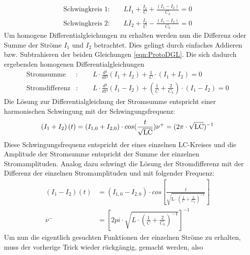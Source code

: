 \documentclass[titlepage = firstcover]{scrartcl}
\begin{document}
        \begin{align}
            \text{Schwingkreis 1:} \qquad L\ddot{I_1} + \frac{I_1}{C} + \frac{\left(I_1 - I_2\right)}{C_k} = 0 \\
            \text{Schwingkreis 2:} \qquad L\ddot{I_2} + \frac{I_2}{C} - \frac{\left(I_1 - I_2\right)}{C_k} = 0 
            \label{eqn:ProtoDGL}
        \end{align}
        Um homogene Differentialgleichungen zu erhalten werden nun die Differenz oder Summe der Ströme $I_1$ und $I_2$ betrachtet. Dies gelingt durch 
        einfaches Addieren bzw. Subtrahieren der beiden Gleichungen \ref{eqn:ProtoDGL}. 
        Die sich dadurch ergebenden homogenen Differentialgleichungen
        \begin{align}
            \text{Stromsumme} &: \qquad L \cdot \frac{d²}{dt²}\left(I_1+I_2\right) + \frac{1}{C} \cdot \left(I_1 + I_2\right) = 0 \\
            \text{Stromdifferenz} &: \qquad L \cdot \frac{d²}{dt²}\left(I_1-I_2\right) + \left(\frac{1}{C}+\frac{2}{C_k}\right) \cdot \left(I_1 - I_2\right) = 0
        \end{align}
        Die Lösung zur Differentialgleichung der Stromsumme entspricht einer harmonischen Schwingung mit der Schwingungsfrequenz:
        \begin{equation}
            \left(I_1 + I_2\right)(t) = \left(I_{1,0} + I_{2,0}\right) \cdot cos(\frac{t}{\sqrt{\text{LC}}}) \\
            \nu^+ = (2\pi \cdot \sqrt{\text{LC}})^{-1} 
            \label{eqn:nu+}
        \end{equation}
        Diese Schwingungsfrequenz entspricht der eines einzelnen LC-Kreises und die Amplitude der Stromsumme entspricht der Summe der einzelnen 
        Stromamplituden. \newline
        Analog dazu schwingt die Lösung der Stromdifferenz mit der Differenz der einzelnen Stromamplituden und mit folgender Frequenz:
        \begin{align}
            \left(I_1 - I_2\right)(t) &= \left(I_{1,0} - I_{2,0}\right) \cdot cos\left[\frac{t}{\sqrt{\text{L} \cdot \left(\frac{1}{C}+\frac{2}{C_k}\right)^{-1}}}\right] \\
            \nu^- &= \left[2pi \cdot \sqrt{L \cdot \left(\frac{1}{C}+\frac{2}{C_k}\right)^{-1}}\right]^{-1} 
            \label{eqn:nu-}
        \end{align}
        Um nun die eigentlich gesuchten Funktionen der einzelnen Ströme zu erhalten, muss der vorherige Trick wieder rückgängig, gemacht werden, also 
\end{document}
